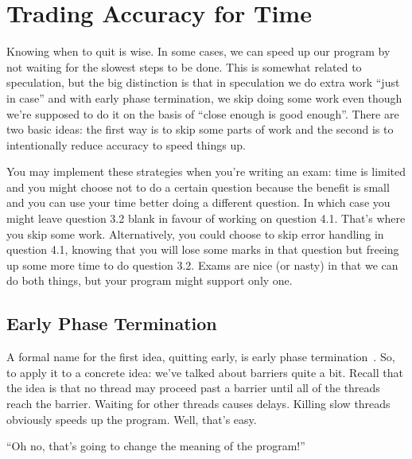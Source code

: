 




\section*{Trading Accuracy for Time}

Knowing when to quit is wise. In some cases, we can speed up our program by not waiting for the slowest steps to be done. This is somewhat related to speculation, but the big distinction is that in speculation we do extra work ``just in case'' and with early phase termination, we skip doing some work even though we're supposed to do it on the basis of ``close enough is good enough''. There are two basic ideas: the first way is to skip some parts of work and the second is to intentionally reduce accuracy to speed things up. 

You may implement these strategies when you're writing an exam: time is limited and you might choose not to do a certain question because the benefit is small and you can use your time better doing a different question. In which case you might leave question 3.2 blank in favour of working on question 4.1. That's where you skip some work. Alternatively, you could choose to skip error handling in question 4.1, knowing that you will lose some marks in that question but freeing up some more time to do question 3.2. Exams are nice (or nasty) in that we can do both things, but your program might support only one.

\subsection*{Early Phase Termination}

A formal name for the first idea, quitting early, is early phase
termination~\cite{Rinard:2007:EarlyPhaseTermination}. So, to apply it to a concrete idea: we've talked about barriers quite a bit. Recall that the idea is that
no thread may proceed past a barrier until all of the threads
reach the barrier. Waiting for other threads causes delays. 
Killing slow threads obviously speeds up the program. Well, that's easy.

\begin{center}
``Oh no, that's going to change the meaning of the program!''
\end{center}

